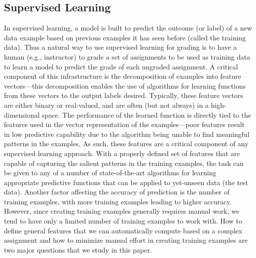 \subsection{Supervised Learning}

In supervised learning, a model is built to predict the outcome (or label)
of a new data example based on previous examples it has seen before (called the
training data). Thus a natural way to use supervised learning for grading
is to have a human (e.g., instructor) to grade a set of assignments to be used
as training data to learn a model to predict the grade of each ungraded
assignment. A critical component of this infrastructure is the
decomposition of examples into feature vectors---this decomposition enables
the use of algorithms for learning functions from these vectors to the
output labels desired. Typically, these feature vectors are either binary
or real-valued, and are often (but not always) in a high-dimensional space.
The performance of the learned function is directly tied to the features
used in the vector representation of the examples---poor features result
in low predictive capability due to the algorithm being unable to find
meaningful patterns in the examples. As such, these features are a
critical component of any supervised learning approach. With a properly
defined set of features that are capable of capturing the salient patterns
in the training examples, the task can be given to any of a number of
state-of-the-art algorithms for learning appropriate predictive functions
that can be applied to yet-unseen data (the test data). Another factor
affecting the accuracy of prediction is the number of training examples, with
more training examples leading to higher accuracy. However, since
creating training examples generally requires manual work, we tend
to have only a limited number of training examples to work with.
How to define general features that we can automatically compute
based on a complex assignment and how to minimize manual effort
in creating training examples are two major questions that we study in this paper.



